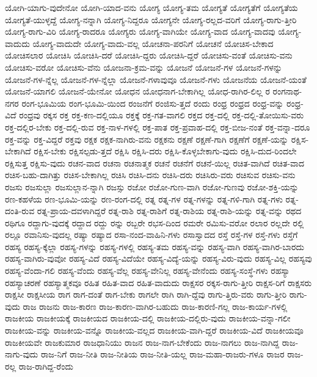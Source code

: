 {ಯೋಗಿ-ಯಾಗು-ವುದೇನೋ
ಯೋಗಿ-ಯಾದ-ವನು
ಯೋಗ್ಯ
ಯೋಗ್ಯ-ತಮ
ಯೋಗ್ಯತೆ
ಯೋಗ್ಯತೆಗೆ
ಯೋಗ್ಯತೆಯ
ಯೋಗ್ಯತೆ-ಯುಳ್ಳದ್ದೆ
ಯೋಗ್ಯ-ನನ್ನಾಗಿ
ಯೋಗ್ಯ-ನಿದ್ದರೂ
ಯೋಗ್ಯನೇ
ಯೋಗ್ಯ-ರಲ್ಲದ-ವರಿಗೆ
ಯೋಗ್ಯ-ರಾಗು-ತ್ತೀರಿ
ಯೋಗ್ಯ-ರಾಗು-ವಿರಿ
ಯೋಗ್ಯ-ರಾದರೂ
ಯೋಗ್ಯರು
ಯೋಗ್ಯ-ವಾಗಿಯೇ
ಯೋಗ್ಯ-ವಾದ
ಯೋಗ್ಯ-ವಾದವು
ಯೋಗ್ಯ-ವಾದುದು
ಯೋಗ್ಯ-ವಾದುದೇ
ಯೋಗ್ಯ-ವಾದು-ವಲ್ಲ
ಯೋಚನಾ-ಪರನಿಗೆ
ಯೋಚನೆ
ಯೋಚಿಸ-ಬೇಕಾದ
ಯೋಚಿಸಲಾರ
ಯೋಚಿಸಿ
ಯೋಚಿಸಿ-ದರೆ
ಯೋಚಿಸಿ-ದ್ದರು
ಯೋಚಿಸಿ-ದ್ದರೆ
ಯೋಚಿಸು-ವಂತೆ
ಯೋಚಿಸು-ವನು
ಯೋಚಿಸು-ವರೋ
ಯೋಚಿಸು-ವೆನು
ಯೋಜನಾ-ಕ್ರಮ-ವನ್ನು
ಯೋಜನೆ
ಯೋಜನೆ-ಗಳ
ಯೋಜನೆ-ಗಳನ್ನು
ಯೋಜನೆ-ಗಳ-ನ್ನೆಲ್ಲ
ಯೋಜನೆ-ಗಳ-ನ್ನೆಲ್ಲಾ
ಯೋಜನೆ-ಗಳಾವುವೂ
ಯೋಜನೆ-ಗಳು
ಯೋಜನೆಯ
ಯೋಜನೆ-ಯಂತೆ
ಯೋಜನೆ-ಯಾಗಲಿ
ಯೋಜನೆ-ಯೇನೋ
ಯೋಧನ
ಯೋಧನಾಗ-ಬೇಕಾಗಿಲ್ಲ
ಯೋಧ-ರಾಗಿರ-ಲಿಲ್ಲ
ರ
ರಂಗನಾಥ-ನಗರ
ರಂಗ-ಭೂಮಿಯ
ರಂಗ-ಭೂಮಿ-ಯಿಂದ
ರಂಜನೆಗೆ
ರಂಜಿಸು-ತ್ತದೆ
ರಂದು
ರಂಧ್ರ
ರಂಧ್ರದ
ರಂಧ್ರ-ವನ್ನು
ರಂಧ್ರ-ವಿದೆ
ರಂಧ್ರವು
ರಕ್ಕಸ
ರಕ್ತ
ರಕ್ತ-ಕಣ-ದಲ್ಲಿಯೂ
ರಕ್ತಕ್ಕೆ
ರಕ್ತ-ಗತ-ವಾಗಲಿ
ರಕ್ತದ
ರಕ್ತ-ದಲ್ಲಿ
ರಕ್ತ-ದಲ್ಲಿ-ತೋಯಿಸು-ವರು
ರಕ್ತ-ದಲ್ಲಿರ-ಬೇಕು
ರಕ್ತ-ದಲ್ಲಿ-ರುವ
ರಕ್ತ-ನಾಳ-ಗಳಲ್ಲಿ
ರಕ್ತ-ಪಾತ
ರಕ್ತ-ಪ್ರವಾಹ-ದಲ್ಲಿ
ರಕ್ತ-ಬೀಜ-ನಂತೆ
ರಕ್ತ-ವನ್ನಾ-ದರೂ
ರಕ್ತ-ವನ್ನು
ರಕ್ತ-ವಿದ್ದರೆ
ರಕ್ತವು
ರಕ್ಷಕ
ರಕ್ಷಕ-ನಾಗಿರು-ವನು
ರಕ್ಷಕನು
ರಕ್ಷಣೆ
ರಕ್ಷಣೆ-ಗಾಗಿ
ರಕ್ಷಣೆಗೆ
ರಕ್ಷಣೆ-ಯನ್ನು
ರಕ್ಷಿಸ-ಬೇಕಾಗಿದೆ
ರಕ್ಷಿಸ-ಬೇಕು
ರಕ್ಷಿಸಲ್ಪಡು-ತ್ತದೆ
ರಕ್ಷಿಸಿ
ರಕ್ಷಿಸಿ-ದರು
ರಕ್ಷಿಸಿ-ಕೊಳ್ಳಬೇಕಾಗು-ವುದು
ರಕ್ಷಿಸಿ-ದುದ-ರಿಂದಲೇ
ರಕ್ಷಿಸುತ್ತ
ರಕ್ಷಿಸು-ವುದು
ರಚನ-ವಾದ
ರಚನಾ
ರಚನಾತ್ಮಕ
ರಚನೆ
ರಚನೆಗೆ
ರಚನೆ-ಯಿಲ್ಲ
ರಚಿತ-ವಾಗಿದೆ
ರಚಿತ-ವಾದ
ರಚಿಸ-ಬಹು-ದಾಗಿತ್ತು
ರಚಿಸ-ಬೇಕಾಗಿಲ್ಲ
ರಚಿಸಿ
ರಚಿಸಿ-ದನು
ರಚಿಸಿ-ದರು
ರಚಿಸಿರು-ವರು
ರಚಿಸುವ
ರಚಿಸು-ವನು
ರಜಸು
ರಜಸುಲ್ಲಾ
ರಜಸುಲ್ಲಾನ-ನ್ನಾಗಿ
ರಜಸ್ಸು
ರಜೋ
ರಜೋ-ಗುಣ-ವಾಗಿ
ರಜೋ-ಗುಣವು
ರಜೋ-ಶಕ್ತಿ-ಯನ್ನು
ರಣ-ಕಹಳೆಯ
ರಣ-ಭೂಮಿ-ಯನ್ನು
ರಣ-ರಂಗ-ದಲ್ಲಿ
ರತ್ನ
ರತ್ನ-ಗಳ
ರತ್ನ-ಗಳನ್ನು
ರತ್ನ-ಗಳಿ-ಗಾಗಿ
ರತ್ನ-ಗಳು
ರತ್ನ-ದಂತಿ-ರುವ
ರತ್ನ-ಪ್ರಾಯ-ದವಳಾಗಿದ್ದರೆ
ರತ್ನ-ರಾಶಿ
ರತ್ನ-ರಾಶಿಗೆ
ರತ್ನ-ರಾಶಿಯ
ರತ್ನ-ರಾಶಿ-ಯನ್ನು
ರತ್ನ-ವನ್ನು
ರಥದ
ರಥಿಗೂ
ರದ್ದಾಗು-ವುದಕ್ಕೆ
ರದ್ದಾದ
ರದ್ದು
ರನ್ನು
ರಬ್ಬರೇ
ರಭಸ-ದಿಂದ
ರಮರೇ
ರಮಿಸು-ವರೋ
ರಲಾರ
ರಲ್ಲದೇ
ರಲ್ಲಿ
ರಲ್ಲೂ
ರವಾನಿಸು-ವುದಲ್ಲ
ರಷ್ಯಾ
ರಷ್ಯಾದ
ರಸಾ-ನಂದ-ವಾಹಿನಿ-ಗಳು
ರಸಾಸ್ವಾದದ
ರಸ್ತೆ
ರಸ್ತೆ-ಗಳ
ರಸ್ತೆ-ಗಳು
ರಸ್ತೆಗೆ
ರಹಸ್ಯ
ರಹಸ್ಯ-ಕ್ಕೆಲ್ಲಾ
ರಹಸ್ಯ-ಗಳನ್ನು
ರಹಸ್ಯ-ಗಳಲ್ಲಿ
ರಹಸ್ಯ-ತಮ
ರಹಸ್ಯ-ವನ್ನು
ರಹಸ್ಯ-ವಾಗಿ
ರಹಸ್ಯ-ವಾಗಿರ-ಬಾರದು
ರಹಸ್ಯ-ವಾಗಿರು-ವುವೋ
ರಹಸ್ಯ-ವಿದೆ
ರಹಸ್ಯ-ವಿದೆಯೇ
ರಹಸ್ಯ-ವಿದ್ಯೆ-ಯನ್ನು
ರಹಸ್ಯ-ವಿರು-ವುದು
ರಹಸ್ಯ-ವಿಲ್ಲ
ರಹಸ್ಯವು
ರಹಸ್ಯ-ವೆಂದಾ-ಗಲಿ
ರಹಸ್ಯ-ವೆಂದು
ರಹಸ್ಯ-ವೆಲ್ಲ
ರಹಸ್ಯ-ವೇನಿಲ್ಲ
ರಹಸ್ಯ-ವೇನೆಂದು
ರಹಸ್ಯ-ಸಂಸ್ಥೆ-ಗಳು
ರಹಸ್ಯಾ
ರಹಸ್ಯಾಚರಣೆ
ರಹಸ್ಯಾತ್ಮಕವೂ
ರಹಿತ
ರಹಿತ-ವಾದ
ರಹಿತ-ವಾದುದು
ರಾಕ್ಷಸರ
ರಕ್ಕಸ-ರಾಗು-ತ್ತೀರಿ
ರಾಕ್ಷಸ-ರಿಗೆ
ರಾಕ್ಷಸರು
ರಾಕ್ಷಸೀ
ರಾಕ್ಷಸೀಯ
ರಾಗ
ರಾಗ-ದಂತೆ
ರಾಗ-ಬೇಕು
ರಾಗಲೇ
ರಾಗಿ
ರಾಗಿ-ದ್ದೆವು
ರಾಗು-ತ್ತಿರು-ವರು
ರಾಗು-ತ್ತೀರಿ
ರಾಗು-ವುದು
ರಾಜ
ರಾಜನು
ರಾಜ-ಕಾರಣ
ರಾಜ-ಕಾರಣ-ವಾಗಿರ-ಬಹುದು
ರಾಜ-ಕಾರಣಿ-ಗಲ್ಲ
ರಾಜ-ಕಾರ್ಯ-ಗಳಲ್ಲಿ
ರಾಜಕೀಯ
ರಾಜಕೀಯಕ್ಕೆ
ರಾಜಕೀಯದ
ರಾಜಕೀಯ-ದಲ್ಲಿ
ರಾಜಕೀಯ-ದಲ್ಲಿರು-ವುದು
ರಾಜಕೀಯ-ವನ್ನಾ-ಗಲೀ
ರಾಜಕೀಯ-ವನ್ನು
ರಾಜಕೀಯ-ವನ್ನೊ
ರಾಜಕೀಯ-ವಲ್ಲದ
ರಾಜಕೀಯ-ವಾಗಿ-ದ್ದರೆ
ರಾಜಕೀಯ-ವಿದೆ
ರಾಜಕೀಯವೂ
ರಾಜಕೀಯವೇ
ರಾಜಕುಮಾರ
ರಾಜಧಾನಿಯು
ರಾಜನ
ರಾಜ-ನಾಗ-ಬೇಕೆಂದು
ರಾಜ-ನಾಗಲು
ರಾಜ-ನಾಗಿದ್ದ
ರಾಜ-ನಾಗು-ವುದು
ರಾಜ-ನಿಗೆ
ರಾಜ-ನೀತಿ
ರಾಜ-ನೀತಿಯ
ರಾಜ-ನೀತಿ-ಯಲ್ಲ
ರಾಜ-ಮಹಾ-ರಾಜರು-ಗಳೂ
ರಾಜರ
ರಾಜ-ರಲ್ಲ
ರಾಜ-ರಾಗಿದ್ದ-ರೆಂದು
}
